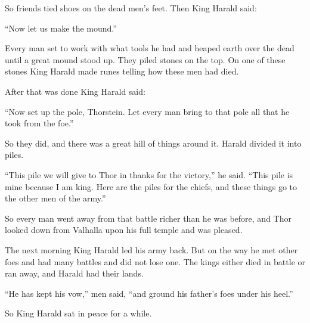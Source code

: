 So friends tied shoes on the dead men's feet. Then King Harald said:

``Now let us make the mound.''

Every man set to work with what tools he had and heaped earth over the
dead until a great mound stood up. They piled stones on the top. On one
of these stones King Harald made runes telling how these men had died.

After that was done King Harald said:

``Now set up the pole, Thorstein. Let every man bring to that pole all
that he took from the foe.''

So they did, and there was a great hill of things around it. Harald
divided it into piles.

``This pile we will give to Thor in thanks for the victory,'' he said.
``This pile is mine because I am king. Here are the piles for the
chiefs, and these things go to the other men of the army.''

So every man went away from that battle richer than he was before, and
Thor looked down from Valhalla upon his full temple and was pleased.

The next morning King Harald led his army back. But on the way he met
other foes and had many battles and did not lose one. The kings either
died in battle or ran away, and Harald had their lands.

``He has kept his vow,'' men said, ``and ground his father's foes under
his heel.''

So King Harald sat in peace for a while.
